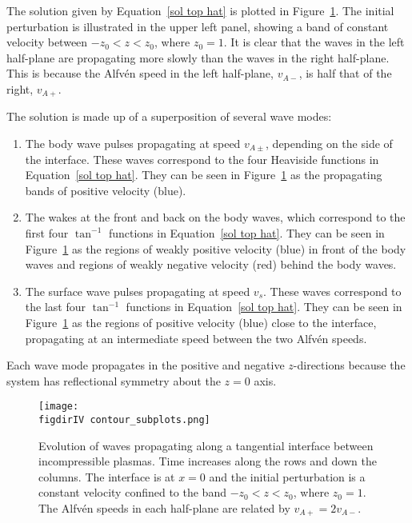 The solution given by Equation~\eqref{sol top hat} is plotted in Figure~\ref{fig: vx incomp sol contour}. The initial perturbation is illustrated in the upper left panel, showing a band of constant velocity between $-z_0 < z < z_0$, where $z_0 = 1$. It is clear that the waves in the left half-plane are propagating more slowly than the waves in the right half-plane. This is because the Alfv\'{e}n speed in the left half-plane, $v_{A-}$, is half that of the right, $v_{A+}$.

The solution is made up of a superposition of several wave modes:
\begin{enumerate}
	\item The body wave pulses propagating at speed $v_{A\pm}$, depending on the side of the interface. These waves correspond to the four Heaviside functions in Equation~\eqref{sol top hat}. They can be seen in Figure~\ref{fig: vx incomp sol contour} as the propagating bands of positive velocity (blue).
	\item The wakes at the front and back on the body waves, which correspond to the first four $\tan^{-1}$ functions in Equation~\eqref{sol top hat}. They can be seen in Figure~\ref{fig: vx incomp sol contour} as the regions of weakly positive velocity (blue) in front of the body waves and regions of weakly negative velocity (red) behind the body waves.
	\item The surface wave pulses propagating at speed $v_{s}$. These waves correspond to the last four $\tan^{-1}$ functions in Equation~\eqref{sol top hat}. They can be seen in Figure~\ref{fig: vx incomp sol contour} as the regions of positive velocity (blue) close to the interface, propagating at an intermediate speed between the two Alfv\'{e}n speeds.
\end{enumerate}
Each wave mode propagates in the positive and negative $z$-directions because the system has reflectional symmetry about the $z = 0$ axis.

\begin{figure}
	\centering
	\texttt{[image: \\figdirIV contour\_subplots.png]}
	\caption{Evolution of waves propagating along a tangential interface between incompressible plasmas. Time increases along the rows and down the columns. The interface is at $x = 0$ and the initial perturbation is a constant velocity confined to the band $-z_0 < z < z_0$, where $z_0 = 1$. The Alfv\'{e}n speeds in each half-plane are related by $v_{A+} = 2v_{A-}$.}
	\label{fig: vx incomp sol contour}
\end{figure}


